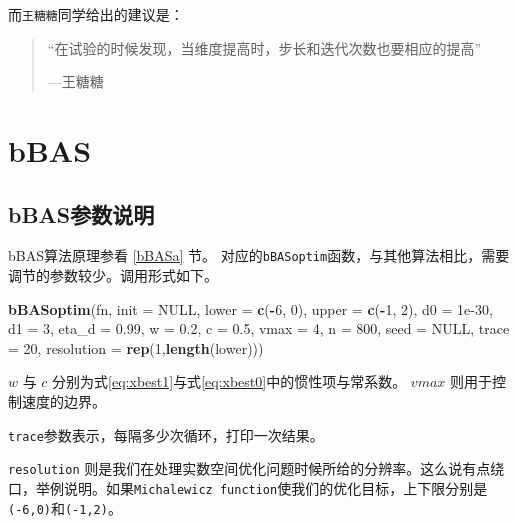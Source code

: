 \documentclass[]{ctexbook}
\newenvironment{Shaded}{\begin{snugshade}}{\end{snugshade}}
\newcommand{\KeywordTok}[1]{\textcolor[rgb]{0.13,0.29,0.53}{\textbf{#1}}}
\newcommand{\DataTypeTok}[1]{\textcolor[rgb]{0.13,0.29,0.53}{#1}}
\newcommand{\DecValTok}[1]{\textcolor[rgb]{0.00,0.00,0.81}{#1}}
\newcommand{\FloatTok}[1]{\textcolor[rgb]{0.00,0.00,0.81}{#1}}
\newcommand{\OtherTok}[1]{\textcolor[rgb]{0.56,0.35,0.01}{#1}}
\newcommand{\OperatorTok}[1]{\textcolor[rgb]{0.81,0.36,0.00}{\textbf{#1}}}
\newcommand{\NormalTok}[1]{#1}
\begin{document}
而\texttt{王糖糖}同学给出的建议是：

\begin{quote}
``在试验的时候发现，当维度提高时，步长和迭代次数也要相应的提高''

\begin{flushright}---王糖糖\end{flushright}
\end{quote}

\section{bBAS}\label{bBASr}

\subsection{bBAS参数说明}\label{bBASfuncparms}

bBAS算法原理参看 \ref{bBASa} 节。
对应的\texttt{bBASoptim}函数，与其他算法相比，需要调节的参数较少。调用形式如下。

\begin{Shaded}
\begin{Highlighting}[]
\KeywordTok{bBASoptim}\NormalTok{(fn, }\DataTypeTok{init =} \OtherTok{NULL}\NormalTok{, }
          \DataTypeTok{lower =} \KeywordTok{c}\NormalTok{(}\OperatorTok{-}\DecValTok{6}\NormalTok{, }\DecValTok{0}\NormalTok{), }\DataTypeTok{upper =} \KeywordTok{c}\NormalTok{(}\OperatorTok{-}\DecValTok{1}\NormalTok{, }\DecValTok{2}\NormalTok{),}
          \DataTypeTok{d0 =} \FloatTok{1e-30}\NormalTok{, }\DataTypeTok{d1 =} \DecValTok{3}\NormalTok{, }\DataTypeTok{eta_d =} \FloatTok{0.99}\NormalTok{, }
          \DataTypeTok{w =} \FloatTok{0.2}\NormalTok{, }\DataTypeTok{c =} \FloatTok{0.5}\NormalTok{, }\DataTypeTok{vmax =} \DecValTok{4}\NormalTok{,}
          \DataTypeTok{n =} \DecValTok{800}\NormalTok{,}
          \DataTypeTok{seed =} \OtherTok{NULL}\NormalTok{, }\DataTypeTok{trace =} \DecValTok{20}\NormalTok{, }\DataTypeTok{resolution =} \KeywordTok{rep}\NormalTok{(}\DecValTok{1}\NormalTok{,}\KeywordTok{length}\NormalTok{(lower)))}
\end{Highlighting}
\end{Shaded}

\(w\) 与 \(c\)
分别为式\eqref{eq:xbest1}与式\eqref{eq:xbest0}中的惯性项与常系数。 \(vmax\)
则用于控制速度的边界。

\texttt{trace}参数表示，每隔多少次循环，打印一次结果。

\texttt{resolution}
则是我们在处理实数空间优化问题时候所给的分辨率。这么说有点绕口，举例说明。如果\texttt{Michalewicz\ function}使我们的优化目标，上下限分别是
\texttt{(-6,0)}和\texttt{(-1,2)}。
\end{document}

